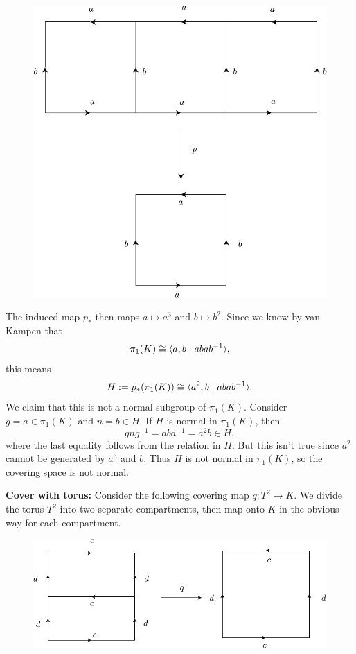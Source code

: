 \documentclass[twoside,10pt]{article}
\begin{document}
\begin{figure}[H]
	\centering
	\includegraphics[scale=1]{fig/20a.pdf}
\end{figure}

The induced map $p_{*}$ then maps $a \mapsto a^{3}$ and $b \mapsto b^{2}$. Since we know by van Kampen that
\[
	\pi_1(K) \cong \langle a,b \;|\; abab^{-1} \rangle,
\] this means
\[
	H := p_*(\pi_1(K)) \cong \langle a^{2},b \;|\; abab^{-1} \rangle.
\] We claim that this is not a normal subgroup of $\pi_1(K)$. Consider $g = a \in \pi_1(K)$ and $n = b \in H$. If $H$ is normal in $\pi_1(K)$, then
\[
g n g^{-1} = a b a^{-1} = a^{2}b \in H,
\] where the last equality follows from the relation in $H$. But this isn't true since $a^{2}$ cannot be generated by $a^{3}$ and $b$. Thus $H$ is not normal in $\pi_1(K)$, so the covering space is not normal.

\textbf{Cover with torus:} Consider the following covering map $q:T^{2}\to K$. We divide the torus $T^{2}$ into two separate compartments, then map onto $K$ in the obvious way for each compartment.

\begin{figure}[H]
	\centering
	\includegraphics[scale=1]{fig/20b.pdf}
\end{figure}
\end{document}
